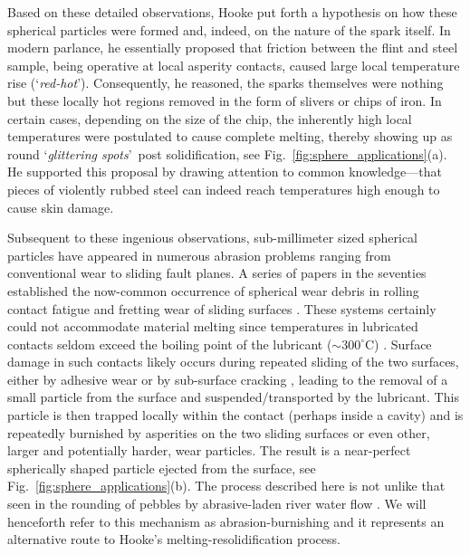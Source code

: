 \documentclass[11pt]{article}
\newcommand{\txq}[1]{\textsl{#1}}
\begin{document}
Based on these detailed observations, Hooke put forth a hypothesis on how these spherical particles were formed and, indeed, on the nature of the spark itself. In modern parlance, he essentially proposed that friction between the flint and steel sample, being operative at local asperity contacts, caused large local temperature rise (\lq \txq{red-hot}\rq ). Consequently, he reasoned, the sparks themselves were nothing but these locally hot regions removed in the form of slivers or chips of iron. In certain cases, depending on the size of the chip, the inherently high local temperatures were postulated to cause complete melting, thereby showing up as round \lq \txq{glittering spots}\rq\ post solidification, see Fig.~\ref{fig:sphere_applications}(a). He supported this proposal by drawing attention to common knowledge---that pieces of violently rubbed steel can indeed reach temperatures high enough to cause skin damage.

Subsequent to these ingenious observations, sub-millimeter sized spherical particles have appeared in numerous abrasion problems ranging from conventional wear to sliding fault planes. A series of papers in the seventies established the now-common occurrence of spherical wear debris in rolling contact fatigue \cite{ScottMills1973a, ScottMills1973b, LoyMcCallum1973} and fretting wear of sliding surfaces \cite{Hurricks1974, StowersRabinowicz1972}. These systems certainly could not accommodate material melting since temperatures in lubricated contacts seldom exceed the boiling point of the lubricant ($\sim 300 ^\circ$C) \cite{Rabinowicz1977}. Surface damage in such contacts likely occurs during repeated sliding of the two surfaces, either by adhesive wear or by sub-surface cracking \cite{WaterhouseTaylor1974}, leading to the removal of a small particle from the surface and suspended/transported by the lubricant. This particle is then trapped locally within the contact (perhaps inside a cavity) and is repeatedly burnished by asperities on the two sliding surfaces or even other, larger and potentially harder, wear particles. The result is a near-perfect spherically shaped particle ejected from the surface, see Fig.~\ref{fig:sphere_applications}(b). The process described here is not unlike that seen in the rounding of pebbles by abrasive-laden river water flow \cite{Bloore1977, NovakETAL2018}. We will henceforth refer to this mechanism as abrasion-burnishing and it represents an alternative route to Hooke's melting-resolidification process.
\end{document}
